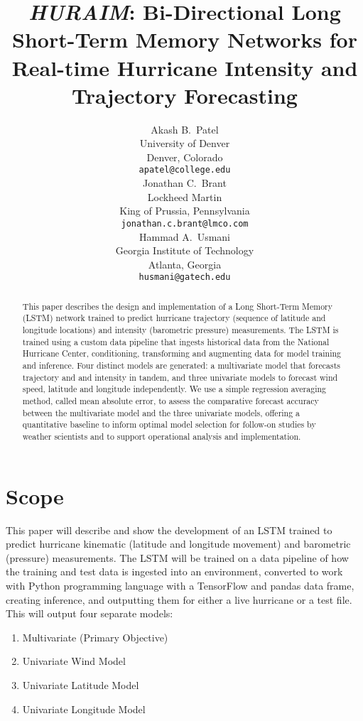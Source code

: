 \documentclass{article}
\title{\emph{HURAIM}: Bi-Directional Long Short-Term Memory Networks for Real-time Hurricane Intensity and Trajectory Forecasting}
\author{
	Akash B.~Patel \\
	University of Denver\\
	Denver, Colorado \\
	\texttt{apatel@college.edu} \\
	\And
	Jonathan C.~Brant \\
	Lockheed Martin\\
	King  of Prussia, Pennsylvania \\
	\texttt{jonathan.c.brant@lmco.com} \\
	\And
	Hammad A.~Usmani \\
	Georgia Institute of Technology\\
	Atlanta, Georgia \\
	\texttt{husmani@gatech.edu}
}
\begin{document}
\maketitle

\begin{abstract}
This paper describes the design and implementation of a Long Short-Term Memory (LSTM) network trained to predict hurricane trajectory (sequence of latitude and longitude locations) and intensity (barometric pressure) measurements. The LSTM is trained using a custom data pipeline that ingests historical data from the National Hurricane Center, conditioning, transforming and augmenting data for model training and inference. Four distinct models are generated: a multivariate model that forecasts trajectory and and intensity in tandem, and three univariate models to forecast wind speed, latitude and longitude independently. We use a simple regression averaging method, called mean absolute error, to assess the comparative forecast accuracy between the multivariate model and the three univariate models, offering a quantitative baseline to inform optimal model selection for follow-on studies by weather scientists and to support operational analysis and implementation.
\end{abstract}


\section{Scope}
This paper will describe and show the development of an LSTM trained to predict hurricane kinematic (latitude and longitude movement) and barometric (pressure) measurements. The LSTM will be trained on a data pipeline of how the training and test data is ingested into an environment, converted to work with Python programming language with a TensorFlow and pandas data frame, creating inference, and outputting them for either a live hurricane or a test file. This will output four separate models:

\begin{enumerate}
	\item Multivariate (Primary Objective)
	\item Univariate Wind Model
	\item Univariate Latitude Model
	\item Univariate Longitude Model
\end{enumerate}
\end{document}

